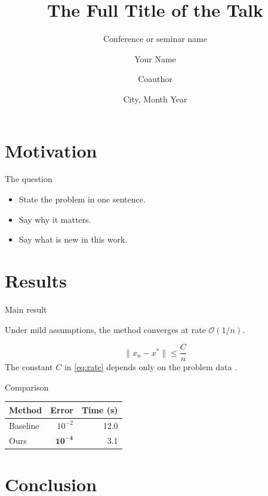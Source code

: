 \documentclass[aspectratio=169]{beamer}
\title[Short title]{The Full Title of the Talk}
\subtitle{Conference or seminar name}
\author[You]{Your Name\inst{1} \and Coauthor\inst{2}}
\institute{\inst{1}Your University \and \inst{2}Their Lab}
\date[Month Year]{City, Month Year}
\begin{document}
\begin{frame}
  \titlepage
\end{frame}

\section{Motivation}

\begin{frame}{The question}
  \begin{itemize}[<+-| alert@+>]
    \item State the problem in one sentence.
    \item Say why it matters.
    \item Say what is new in this work.
  \end{itemize}
\end{frame}

\section{Results}

\begin{frame}{Main result}
  \begin{theorem}[Informal]
    Under mild assumptions, the method converges at rate $\mathcal{O}(1/n)$.
  \end{theorem}
  \pause
  \begin{equation}
    \| x_n - x^\ast \| \le \frac{C}{n} \label{eq:rate}
  \end{equation}
  \pause
  The constant $C$ in \eqref{eq:rate} depends only on the problem data \cite{ref1}.
\end{frame}

\begin{frame}{Comparison}
  \centering
  \begin{tabular}{lrr}
    \toprule
    Method & Error & Time (s) \\
    \midrule
    Baseline & $10^{-2}$ & 12.0 \\ \pause
    \alert{Ours} & $\mathbf{10^{-4}}$ & 3.1 \\
    \bottomrule
  \end{tabular}
\end{frame}

\section{Conclusion}
\end{document}
